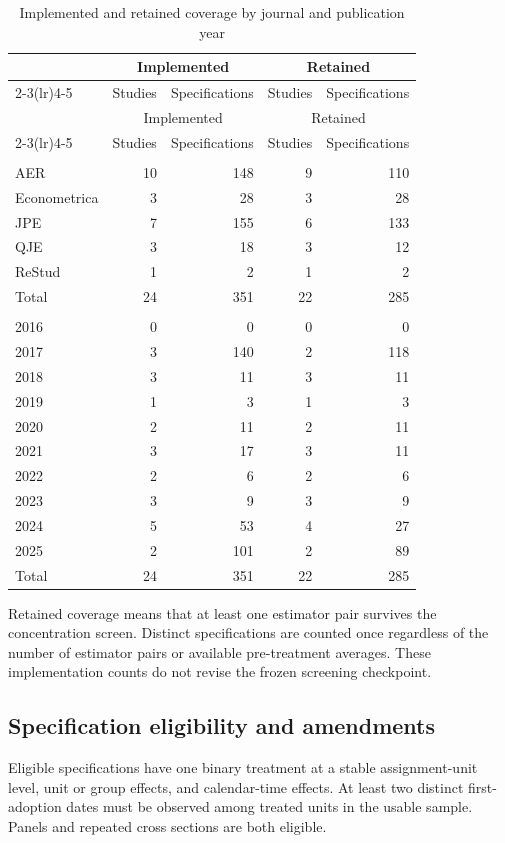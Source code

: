 \documentclass[11pt,letterpaper]{article}
\begin{document}
\begin{longtable}{lrrrr}
\caption{Implemented and retained coverage by journal and publication year}\label{tab:coverage}\\
\toprule
& \multicolumn{2}{c}{Implemented} & \multicolumn{2}{c}{Retained}\\
\cmidrule(lr){2-3}\cmidrule(lr){4-5}
& Studies & Specifications & Studies & Specifications\\
\midrule
\endfirsthead
\toprule
& \multicolumn{2}{c}{Implemented} & \multicolumn{2}{c}{Retained}\\
\cmidrule(lr){2-3}\cmidrule(lr){4-5}
& Studies & Specifications & Studies & Specifications\\
\midrule
\endhead
\bottomrule
\endfoot
\multicolumn{5}{l}{\emph{Journal}}\\
AER & 10 & 148 & 9 & 110\\
Econometrica & 3 & 28 & 3 & 28\\
JPE & 7 & 155 & 6 & 133\\
QJE & 3 & 18 & 3 & 12\\
ReStud & 1 & 2 & 1 & 2\\
Total & 24 & 351 & 22 & 285\\
\addlinespace
\multicolumn{5}{l}{\emph{Publication year}}\\
2016 & 0 & 0 & 0 & 0\\
2017 & 3 & 140 & 2 & 118\\
2018 & 3 & 11 & 3 & 11\\
2019 & 1 & 3 & 1 & 3\\
2020 & 2 & 11 & 2 & 11\\
2021 & 3 & 17 & 3 & 11\\
2022 & 2 & 6 & 2 & 6\\
2023 & 3 & 9 & 3 & 9\\
2024 & 5 & 53 & 4 & 27\\
2025 & 2 & 101 & 2 & 89\\
Total & 24 & 351 & 22 & 285\\
\end{longtable}
Retained coverage means that at least one estimator pair survives the concentration screen. Distinct specifications are counted once regardless of the number of estimator pairs or available pre-treatment averages. These implementation counts do not revise the frozen screening checkpoint.

\subsection{Specification eligibility and amendments}
Eligible specifications have one binary treatment at a stable assignment-unit level, unit or group effects, and calendar-time effects. At least two distinct first-adoption dates must be observed among treated units in the usable sample. Panels and repeated cross sections are both eligible.
\end{document}
